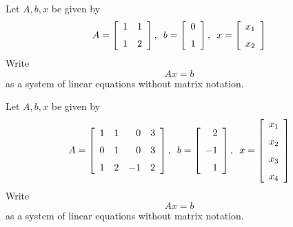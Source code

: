 \documentclass[12pt]{amsbook}
\numberwithin{equation}{section}
\theoremstyle{plain} %
\theoremstyle{definition}
\theoremstyle{remark}
\begin{document}
\begin{Exercise}
%
Let $A, b, x$ be given by
\begin{align*}
A =  \left[ 
\begin{array}{rr} 
1& 1\\ \noalign{\medskip}            
1& 2   
\end{array}
 \right],\,\,\, b =  \left[ 
\begin{array}{r} 
0\\ \noalign{\medskip}   
1 
\end{array}
 \right],\,\,\,
 x=  \left[ 
\begin{array}{r} 
x_1\\ \noalign{\medskip}   
x_2
\end{array}
 \right] 
\end{align*}
Write $$Ax=b$$ 
as a system of linear equations without matrix notation.
\end{Exercise}

\begin{Exercise}
Let $A, b, x$ be given by
\begin{align*}
A =  \left[ 
\begin{array}{rrrr} 
1& 1& 0& 3\\ \noalign{\medskip}   
0& 1&  0&3\\ \noalign{\medskip}         
1& 2   &-1& 2 
\end{array}
 \right],\,\,\, b =  \left[ 
\begin{array}{r} 
2\\ \noalign{\medskip}   
-1\\ \noalign{\medskip}         
1 
\end{array}
 \right],\,\,\,
 x=  \left[ 
\begin{array}{r} 
x_1\\ \noalign{\medskip}   
x_2\\ \noalign{\medskip} 
x_3\\ \noalign{\medskip}                 
x_4   
\end{array}
 \right] 
\end{align*}
Write $$Ax=b$$ 
as a system of linear equations without matrix notation.
\end{Exercise}
\end{document}
